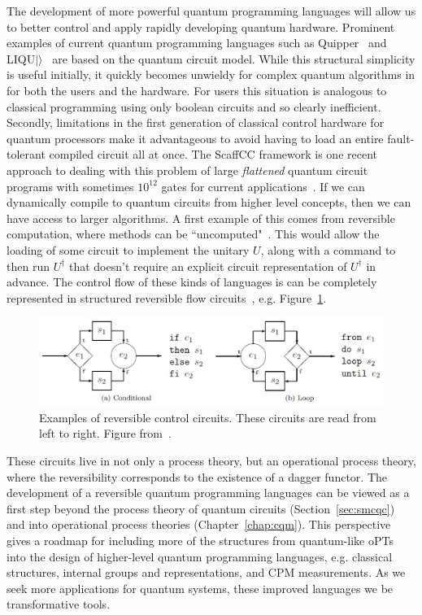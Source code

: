 The development of more powerful quantum programming languages will allow us to better control and apply rapidly developing quantum hardware. Prominent examples of current quantum programming languages such as Quipper~\cite{green2013quipper} and LIQU$|\rangle$~\cite{wecker2014liqui} are based on the quantum circuit model. While this structural simplicity is useful initially, it quickly becomes unwieldy for complex quantum algorithms in for both the users and the hardware. For users this situation is analogous to classical programming using only boolean circuits and so clearly inefficient. Secondly, limitations in the first generation of classical control hardware for quantum processors make it advantageous to avoid having to load an entire fault-tolerant compiled circuit all at once. The ScaffCC framework is one recent approach to dealing with this problem of large \textit{flattened} quantum circuit programs with sometimes $10^{12}$ gates for current applications~\cite{javadiabhari2014scaffcc}.  If we can dynamically compile to quantum circuits from higher level concepts, then we can have access to larger algorithms. A first example of this comes from reversible computation, where methods can be ``uncomputed"~\cite{yokoyama2008principles}. This would allow the loading of some circuit to implement the unitary $U$, along with a command to then run $U^{\dagger}$ that doesn't require an explicit circuit representation of $U^{\dagger}$ in advance. The control flow of these kinds of languages is can be completely represented in structured reversible flow circuits~\cite{yokoyama2008reversible}, e.g. Figure~\ref{fig:reversible}.

\begin{figure}[t]
\centering
\includegraphics[scale=0.45]{figures/reversible.eps}
\caption[Example of reversible control circuits.]{Examples of reversible control circuits.  These circuits are read from left to right.  Figure from~\cite{yokoyama2010reversible}.}
\label{fig:reversible}
\end{figure}

These circuits live in not only a process theory, but an operational process theory, where the reversibility corresponds to the existence of a dagger functor. The development of a reversible quantum programming languages can be viewed as a first step beyond the process theory of quantum circuits (Section~\ref{sec:smcqc}) and into operational process theories (Chapter~\ref{chap:cqm}). This perspective gives a roadmap for including more of the structures from quantum-like oPTs into the design of higher-level quantum programming languages, e.g. classical structures, internal groups and representations, and CPM measurements. As we seek more applications for quantum systems, these improved languages we be transformative tools.
